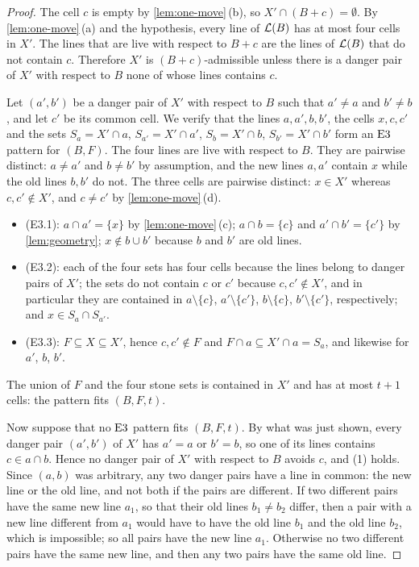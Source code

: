 \begin{proof}
The cell $c$ is empty by \cref{lem:one-move}\,(b), so $X'\cap(B+c)=\emptyset$. By
\cref{lem:one-move}\,(a) and the hypothesis, every line of $\mathcal{L}(B)$ has at most four cells in $X'$. The
lines that are live with respect to $B+c$ are the lines of $\mathcal{L}(B)$ that do not contain $c$. Therefore
$X'$ is $(B+c)$-admissible unless there is a danger pair of $X'$ with respect to $B$ none of whose lines
contains $c$.

Let $(a',b')$ be a danger pair of $X'$ with respect to $B$ such that $a'\ne a$ and $b'\ne b$, and let $c'$ be
its common cell. We verify that the lines $a,a',b,b'$, the cells $x,c,c'$ and the sets $S_a=X'\cap a$,
$S_{a'}=X'\cap a'$, $S_b=X'\cap b$, $S_{b'}=X'\cap b'$ form an $\mathrm{E3}$ pattern for $(B,F)$. The four lines are
live with respect to $B$. They are pairwise distinct: $a\ne a'$ and $b\ne b'$ by assumption, and the new
lines $a,a'$ contain $x$ while the old lines $b,b'$ do not. The three cells are pairwise distinct: $x\in X'$
whereas $c,c'\notin X'$, and $c\ne c'$ by \cref{lem:one-move}\,(d).
\begin{itemize}[leftmargin=2.2em]
\item (E3.1): $a\cap a'=\{x\}$ by \cref{lem:one-move}\,(c); $a\cap b=\{c\}$ and $a'\cap b'=\{c'\}$ by
  \cref{lem:geometry}; $x\notin b\cup b'$ because $b$ and $b'$ are old lines.
\item (E3.2): each of the four sets has four cells because the lines belong to danger pairs of $X'$; the
  sets do not contain $c$ or $c'$ because $c,c'\notin X'$, and in particular they are contained in
  $a\setminus\{c\}$, $a'\setminus\{c'\}$, $b\setminus\{c\}$, $b'\setminus\{c'\}$, respectively; and
  $x\in S_a\cap S_{a'}$.
\item (E3.3): $F\subseteq X\subseteq X'$, hence $c,c'\notin F$ and $F\cap a\subseteq X'\cap a=S_a$, and
  likewise for $a'$, $b$, $b'$.
\end{itemize}
The union of $F$ and the four stone sets is contained in $X'$ and has at most $t+1$ cells: the pattern fits
$(B,F,t)$.

Now suppose that no $\mathrm{E3}$ pattern fits $(B,F,t)$. By what was just shown, every danger pair $(a',b')$ of
$X'$ has $a'=a$ or $b'=b$, so one of its lines contains $c\in a\cap b$. Hence no danger pair of $X'$ with
respect to $B$ avoids $c$, and (1) holds. Since $(a,b)$ was arbitrary, any two danger pairs have a line in
common: the new line or the old line, and not both if the pairs are different. If two different pairs have
the same new line $a_1$, so that their old lines $b_1\ne b_2$ differ, then a pair with a new line different
from $a_1$ would have to have the old line $b_1$ and the old line $b_2$, which is impossible; so all pairs
have the new line $a_1$. Otherwise no two different pairs have the same new line, and then any two pairs
have the same old line.
\end{proof}

